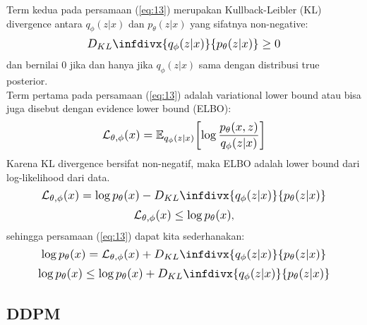 \documentclass{article}
\newcommand{\infdiv}{D_{KL}\infdivx}
\newcommand*{\Scale}[2][4]{\scalebox{#1}{\ensuremath{#2}}}
\begin{document}
Term kedua pada persamaan (\ref{eq:13}) merupakan Kullback-Leibler (KL) divergence antara $ q_\phi(z|x) $ dan $ p_\theta(z|x) $ yang sifatnya non-negative:
\begin{equation}
\Scale[1.2]{ \displaystyle \infdiv{q_\phi(z|x)}{p_\theta(z|x)} \geq 0}
\end{equation}
dan bernilai 0 jika dan hanya jika $ q_\phi(z|x) $ sama dengan distribusi true posterior.
\\
Term pertama pada persamaan (\ref{eq:13}) adalah variational lower bound atau bisa juga disebut dengan evidence lower bound (ELBO):
\begin{equation}
\Scale[1.2]{ \displaystyle \mathcal{L}_{\theta,\phi}(x) = \mathbb{E}_{q_\phi(z|x)} \left[ \log \frac{p_\theta(x,z)}{q_\phi(z|x)} \right] }
\end{equation}
Karena KL divergence bersifat non-negatif, maka ELBO adalah lower bound dari log-likelihood dari data.                                                                                                                                                                                                                                                                                                                                                                             
\begin{equation}
\Scale[1.2]{ \displaystyle \mathcal{L}_{\theta,\phi}(x) = \log p_\theta(x) -  \infdiv{q_\phi(z|x)}{p_\theta(z|x)}}
\end{equation}
\begin{equation}
\Scale[1.2]{ \displaystyle \mathcal{L}_{\theta,\phi}(x) \leq \log p_\theta(x) },
\end{equation}
sehingga persamaan (\ref{eq:13}) dapat kita sederhanakan:
\begin{equation}
\Scale[1.2]{\displaystyle \log p_\theta(x) = 
\mathcal{L}_{\theta,\phi}(x)
+
 \infdiv{q_\phi(z|x)}{p_\theta(z|x)}
}
\end{equation}
\begin{equation}
\Scale[1.2]{\displaystyle \log p_\theta(x) \leq 
\log p_\theta(x)
+
 \infdiv{q_\phi(z|x)}{p_\theta(z|x)}
}
\end{equation}


\subsection{DDPM}
\end{document}
